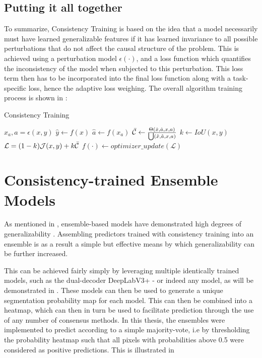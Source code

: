 \subsection{Putting it all together}
To summarize, Consistency Training is based on the idea that a model necessarily must have learned generalizable features if it has learned invariance to all possible perturbations that do not affect the causal structure of the problem. This is achieved using a perturbation model \(\epsilon(\cdot)\), and a loss function which quantifies the inconsistency of the model when subjected to this perturbation. This loss term then has to be incorporated into the final loss function along with a task-specific loss, hence the adaptive loss weighing. The overall algorithm training process is shown in :
\begin{algorithm}[h!]
    \caption{Consistency Training}\label{alg:consistency}
    \begin{algorithmic}
        \State $x_a, a = \epsilon(x, y)$
        \State $\hat{y} \gets f(x)$
        \State $\hat{a} \gets f(x_a)$
        \State $\Bar{\mathcal{C}} \gets \frac{\Theta(\hat{x}, \hat{a},x,a)}{\bigcup(\hat{x}, \hat{a},x,a)}$
        \State $k \gets IoU(x,y)$
        \State $\mathcal{L} = (1-k) \mathcal{J}(x,y) + k \Bar{\mathcal{C}}$
        \State $f(\cdot) \gets optimizer\_update(\mathcal{L})$
        \EndFor
    \EndFor
    \end{algorithmic}
\end{algorithm}


\section{Consistency-trained Ensemble Models}
As mentioned in , ensemble-based models have demonstrated high degrees of generalizability \cite{divergentnets, endoensemble}. Assembling predictors trained with consistency training into an ensemble is as a result a simple but effective means by which generalizability can be further increased. 

This can be achieved fairly simply by leveraging multiple identically trained models, such as the dual-decoder DeepLabV3+ - or indeed any model, as will be demonstrated in . These models can then be used to generate a unique segmentation probability map for each model. This can then be combined into a heatmap, which can then in turn be used to facilitate prediction through the use of any number of consensus methods. In this thesis, the ensembles were implemented to predict according to a simple majority-vote, i.e by thresholding the probability heatmap such that all pixels with probabilities above 0.5 were considered as positive predictions. This is illustrated in 

